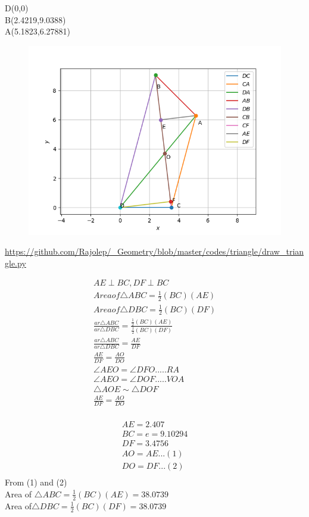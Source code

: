 \begin{frame}
D(0,0)\\
B(2.4219,9.0388)\\
A(5.1823,6.27881)\\
\begin{figure}
\includegraphics[scale=0.3]{./figs/triexe.png}
\end{figure}
\url{https://github.com/Rajolep/_Geometry/blob/master/codes/triangle/draw_triangle.py}
\end{frame}
\begin{frame}
\begin{align*}
AE\perp BC , DF\perp BC\\
Area of \triangle{ABC} = \frac{1}{2}(BC)(AE)\\
Area of \triangle{DBC} = \frac{1}{2}(BC)(DF)\\
\frac{ar\triangle{ABC}}{ar\triangle{DBC}}=\frac{\frac{1}{2}(BC)(AE)}{\frac{1}{2}(BC)(DF)}\\  
\frac{ar\triangle{ABC}}{ar\triangle{DBC}}=\frac{AE}{DF}\\
\frac{AE}{DF}=\frac{AO}{DO}\\
\angle{AEO}=\angle{DFO}..... RA\\
\angle{AEO}=\angle{DOF}..... VOA\\
\triangle{AOE} \sim \triangle{DOF}\\
\frac{AE}{DF}=\frac{AO}{DO}\\
\end{align*}
\end{frame}
\begin{frame}
\begin{align*}
AE=2.407\\
BC=e=9.10294\\
DF=3.4756\\
AO=AE...(1)\\
DO=DF...(2)\\
\end{align*}
From  (1) and  (2)\\
Area of $\triangle{ABC} = \frac{1}{2}(BC)(AE)  = 38.0739$\\
Area of$ \triangle{DBC} = \frac{1}{2}(BC)(DF)  = 38.0739$\\
\end{frame}